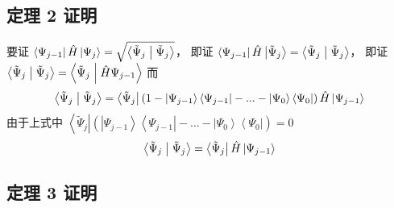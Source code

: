 \subsection{定理 2 证明}
要证 $\left\langle {{\Psi_{j - 1}}} \right|\hat H\left| {{\Psi_j}} \right\rangle  = \sqrt {\left\langle {{{{\tilde \Psi }_j}}}
 \mathrel{\left | {\vphantom {{{{\tilde \Psi }_j}} {{{\tilde \Psi }_j}}}}
 \right. \kern-\nulldelimiterspace}
 {{{{\tilde \Psi }_j}}} \right\rangle }$， 即证 $\left\langle {{\Psi_{j - 1}}} \right|\hat H\left| {{{\tilde \Psi }_j}} \right\rangle  = \left\langle {{{{\tilde \Psi }_j}}}
 \mathrel{\left | {\vphantom {{{{\tilde \Psi }_j}} {{{\tilde \Psi }_j}}}}
 \right. \kern-\nulldelimiterspace}
 {{{{\tilde \Psi }_j}}} \right\rangle$， 即证 $\left\langle {{{{\tilde \Psi }_j}}}
 \mathrel{\left | {\vphantom {{{{\tilde \Psi }_j}} {{{\tilde \Psi }_j}}}}
 \right. \kern-\nulldelimiterspace}
 {{{{\tilde \Psi }_j}}} \right\rangle  = \left\langle {{{{\tilde \Psi }_j}}}
 \mathrel{\left | {\vphantom {{{{\tilde \Psi }_j}} {\hat H{\Psi_{j - 1}}}}}
 \right. \kern-\nulldelimiterspace}
 {{\hat H{\Psi_{j - 1}}}} \right\rangle $
而
\begin{equation}
\left\langle {{{{\tilde \Psi }_j}}}
 \mathrel{\left | {\vphantom {{{{\tilde \Psi }_j}} {{{\tilde \Psi }_j}}}}
 \right. \kern-\nulldelimiterspace}
 {{{{\tilde \Psi }_j}}} \right\rangle  = \left\langle {{{\tilde \Psi }_j}} \right|\left( {1 - \left| {{\Psi_{j - 1}}} \right\rangle \left\langle {{\Psi_{j - 1}}} \right| - ... - \left| {{\Psi_0}} \right\rangle \left\langle {{\Psi_0}} \right|} \right)\hat H\left| {{\Psi_{j - 1}}} \right\rangle 
\end{equation}
由于上式中  $\left\langle {{{\tilde \Psi }_j}} \right|\left( {\left| {{\Psi_{j - 1}}} \right\rangle \left\langle {{\Psi_{j - 1}}} \right| - ... - \left| {{\Psi_0}} \right\rangle \left\langle {{\Psi_0}} \right|} \right) = 0$
\begin{equation}
 \left\langle {{{{\tilde \Psi }_j}}}
 \mathrel{\left | {\vphantom {{{{\tilde \Psi }_j}} {{{\tilde \Psi }_j}}}}
 \right. \kern-\nulldelimiterspace}
 {{{{\tilde \Psi }_j}}} \right\rangle  = \left\langle {{{\tilde \Psi }_j}} \right|\hat H\left| {{\Psi_{j - 1}}} \right\rangle
\end{equation}

\subsection{定理 3 证明}

